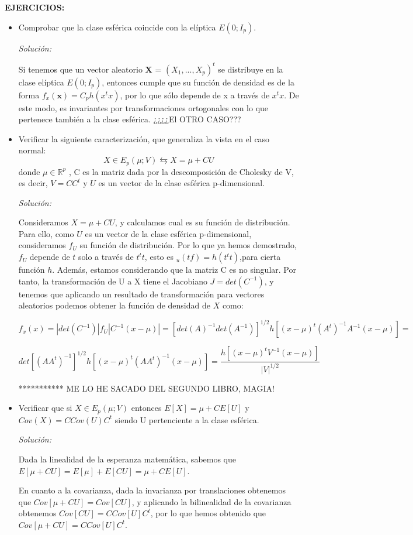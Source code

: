 \documentclass{article}
\theoremstyle{theorem-style}  %
\theoremstyle{definition}
\theoremstyle{example-style}
\begin{document}
	\textbf{EJERCICIOS:}
		\begin{itemize}
			\item Comprobar que la clase esférica coincide con la elíptica $E(0; I_p )$.
			
			\textit{Solución:} 
			
			Si tenemos que un vector aleatorio \textbf{X} = $(X_1, ..., X_p)^t$ se distribuye en la clase elíptica $E(0; I_p )$, entonces cumple que su función de densidad es de la forma $f_x(\textbf{x}) = C_p h (x^tx)$, por lo que sólo depende de x a través de $x^tx$. De este modo, es invariantes por transformaciones ortogonales con lo que pertenece también a la clase esférica. ¿¿¿¿El OTRO CASO???
			
			\item Verificar la siguiente caracterización, que generaliza la vista en el caso normal: $$ X \in E_p(\mu; V) \leftrightarrows X = \mu + CU $$ donde $\mu \in \mathbb{R}^p$ , C es la matriz dada por la descomposición de Cholesky de V, es decir, $V=CC^t$ y $U$ es un vector de la clase esférica p-dimensional.
			
			\textit{Solución:}
			
				Consideramos $X = \mu + CU $, y calculamos cual es su función de distribución. Para ello, como $U$ es un vector de la clase esférica p-dimensional, consideramos $f_U$ su función de distribución. Por lo que ya hemos demostrado, $f_U$ depende de $t$ solo a través de $t^tt$, esto es $_u(tf)=h(t^tt)$,para cierta función $h$. Además, estamos considerando que la matriz C es no singular. Por tanto, la transformación de U a X tiene el Jacobiano $J = det(C^{-1})$, y tenemos que aplicando un resultado de transformación para vectores aleatorios podemos obtener la función de densidad de $X$ como:
				
				\[
					f_x(x) = |det(C^{-1})| f_U |C^{-1}(x-\mu)| = [det(A)^{-1}det(A^{-1})]^{1/2}h[(x-\mu)^t(A^t)^{-1}A^{-1}(x-\mu)] =
				\]
								
				\[
									det[(AA^t)^{-1}]^{1/2}h[(x-\mu)^t(AA^t)^{-1}(x-\mu)] = \frac{h[(x-\mu)^tV^{-1}(x-\mu)]}{|V|^{1/2}}				
				\]



			*********** ME LO HE SACADO DEL SEGUNDO LIBRO, MAGIA!
				

				
				
			\item Verificar que si $X \in E_p(\mu; V)$  entonces $E[X] = \mu + CE[U]$ y $Cov(X)= C Cov(U)C^t$ siendo U pertenciente a la clase esférica.
			
			\textit{Solución:}
			
			Dada la linealidad de la esperanza matemática, sabemos que $E[\mu + CU] = E[\mu] + E[CU] = \mu + CE[U]$.
			
			En cuanto a la covarianza, dada la invarianza por translaciones obtenemos que $Cov[\mu + CU] = Cov[CU]$, y aplicando la bilinealidad de la covarianza obtenemos $Cov[CU] = C Cov[U]C^t$, por lo que hemos obtenido que $Cov[\mu + CU] = C Cov[U] C^t$.

		\end{itemize}
		
\end{document}
